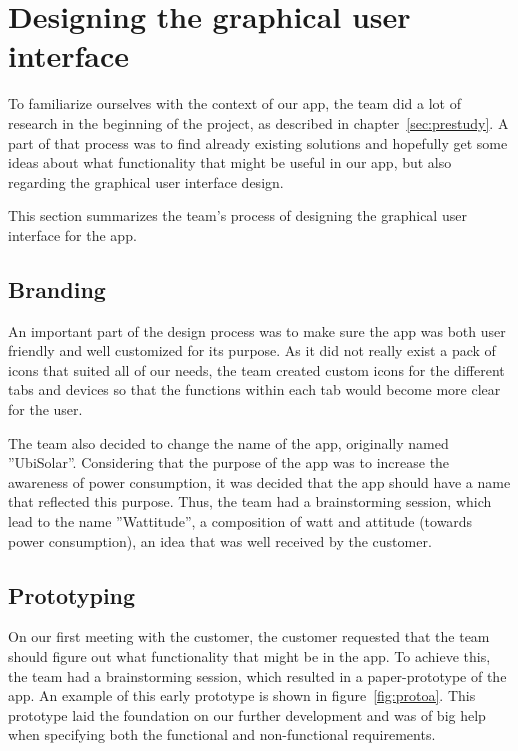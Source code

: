 \section{Designing the graphical user interface}
To familiarize ourselves with the context of our app, the team did a lot of research in the beginning of the project, as described in chapter~\ref{sec:prestudy}. A part of that process was to find already existing solutions and hopefully get some ideas about what functionality that might be useful in our app, but also regarding the graphical user interface design.

This section summarizes the team's process of designing the graphical user interface for the app.

\subsection{Branding}
An important part of the design process was to make sure the app was both user friendly and well customized for its purpose. As it did not really exist a pack of icons that suited all of our needs, the team created custom icons for the different tabs and devices so that the functions within each tab would become more clear for the user.

The team also decided to change the name of the app, originally named ''UbiSolar''. Considering that the purpose of the app was to increase the awareness of power consumption, it was decided that the app should have a name that reflected this purpose. Thus, the team had a brainstorming session, which lead to the name ''Wattitude'', a composition of watt and attitude (towards power consumption), an idea that was well received by the customer.



\subsection{Prototyping}
On our first meeting with the customer, the customer requested that the team should figure out what functionality that might be in the app. To achieve this, the team had a brainstorming session, which resulted in a paper-prototype of the app. An example of this early prototype is shown in figure~\ref{fig:protoa}. This prototype laid the foundation on our further development and was of big help when specifying both the functional and non-functional requirements.

